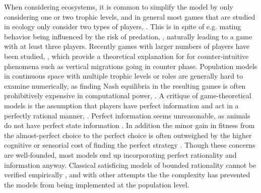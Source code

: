 When considering ecosystems, it is common to simplify the model by only considering one or two trophic levels, and in general most games that are studied in ecology only consider two types of players, \citep{cressman2004ideal,abrams2007role}. This is in spite of e.g. mating behavior being influenced by the risk of predation, \citep{carranza1999red,lima2009predators}, naturally leading to a game with at least three players. Recently games with larger numbers of players have been studied, \citep{pinti2019trophic}, which provide a theoretical explanation for for counter-intuitive phenomena such as vertical migrations going in counter phase. Population models in continuous space with multiple trophic levels or roles are generally hard to examine numerically, as finding Nash equilibria in the resulting games is often prohibitively expensive in computational power, \citep{empirical_trait,pinti2019trophic}. A critique of game-theoretical models is the assumption that players have perfect information and act in a perfectly rational manner, \citep{jones1999bounded}. Perfect information seems unreasonable, as animals do not have perfect state information \citep{simon1955behavioral}. In addition the minor gain in fitness from the almost-perfect choice to the perfect choice is often outweighed by the higher cognitive or sensorial cost of finding the perfect strategy \citep{simon1956rational, cohen2019bounded}. Though these concerns are well-founded, most models end up incorporating perfect rationality and information anyway. Classical satisficing models of bounded rationality cannot be verified empirically \citep{nonacs1993satisficing}, and with other attempts the \citep{bayesianmodel, thuijsman1995automata} the complexity has prevented the models from being implemented at the population level.




